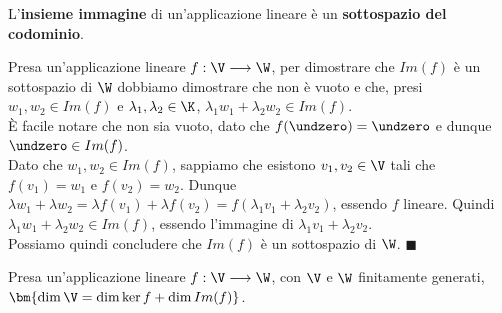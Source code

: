 \documentclass[11pt, a4paper, titlepage, oneside]{scrbook}
\begin{document}
\begin{Osservazione}[]
\label{oss-immagine-sottospazio}
L'\textbf{insieme immagine} di un'applicazione lineare è un \textbf{sottospazio del codominio}.
\end{Osservazione}

\Dimostrazione \nopagebreak

Presa un'applicazione lineare $f: \V \longrightarrow \W$, per dimostrare che $Im(f)$ è un sottospazio di $\W$ dobbiamo dimostrare che non è vuoto e che, presi $w_1, w_2 \in Im(f)$ e $\lambda_1, \lambda_2 \in \K$, \mbox{$\lambda_1 w_1 + \lambda_2 w_2 \in Im(f)$}. \\
È facile notare che non sia vuoto, dato che $f(\undzero) = \undzero$ e dunque $\undzero \in Im(f)$. \\
Dato che $w_1, w_2 \in Im(f)$, sappiamo che esistono $v_1, v_2 \in \V$ tali che $f(v_1) = w_1$ e $f(v_2) = w_2$. Dunque $\lambda w_1 + \lambda w_2 = \lambda f(v_1) + \lambda f(v_2) = f(\lambda_1 v_1 + \lambda_2 v_2)$, essendo $f$ lineare. Quindi \mbox{$\lambda_1 w_1 + \lambda_2 w_2 \in Im(f)$}, essendo l'immagine di $\lambda_1 v_1 + \lambda_2 v_2$.\\
Possiamo quindi concludere che $Im(f)$ è un sottospazio di $\W$. $\blacksquare$

\begin{Proposizione}[]
\label{propos-dim-dominio-dim-ker-dim-im}
Presa un'applicazione lineare $f: \V \longrightarrow \W$, con $\V$ e $\W$ finitamente generati, \mbox{$\bm{\dim \V = \dim \ker f + \dim Im(f)}$}.
\end{Proposizione}

\Dimostrazione \nopagebreak
\end{document}
